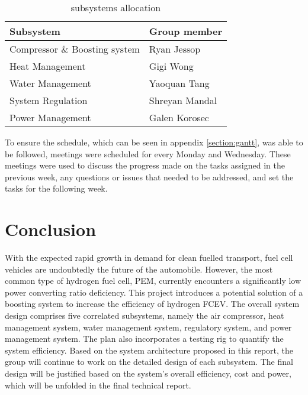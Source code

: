 \documentclass[a4paper,11pt]{article}
\begin{document}
\begin{table}[h!]
    \centering
    \begin{tabular}{|l|l|}%
    \hline
    \textbf{Subsystem} & \textbf{Group member} \\ [0.5ex] 
    \hline
    Compressor \& Boosting system & Ryan Jessop \\
    Heat Management & Gigi Wong \\
    Water Management & Yaoquan Tang \\
    System Regulation & Shreyan Mandal \\
    Power Management & Galen Korosec \\
    \hline
    \end{tabular}
    \caption{subsystems allocation}
    \label{tab:groupworkassignments}
\end{table}

To ensure the schedule, which can be seen in appendix \ref{section:gantt}, was able to be followed, meetings were scheduled for every Monday and Wednesday. These meetings were used to discuss the progress made on the tasks assigned in the previous week, any questions or issues that needed to be addressed, and set the tasks for the following week.

\section{Conclusion}
With the expected rapid growth in demand for clean fuelled transport, fuel cell vehicles are undoubtedly the future of the automobile. However, the most common type of hydrogen fuel cell, PEM, currently encounters a significantly low power converting ratio deficiency. This project introduces a potential solution of a boosting system to increase the efficiency of hydrogen FCEV. The overall system design comprises five correlated subsystems, namely the air compressor, heat management system, water management system, regulatory system, and power management system. The plan also incorporates a testing rig to quantify the system efficiency.
Based on the system architecture proposed in this report, the group will continue to work on the detailed design of each subsystem. The final design will be justified based on the system's overall efficiency, cost and power, which will be unfolded in the final technical report.

\newline
\end{document}

